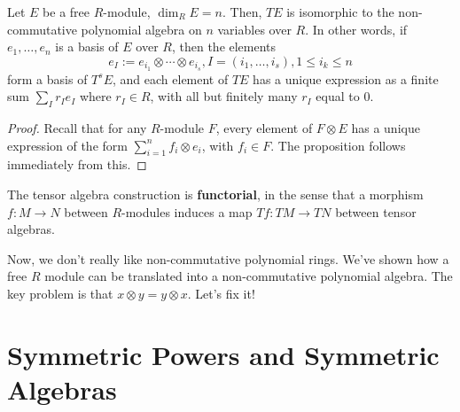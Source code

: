 \begin{prop}
    Let $E$ be a free $R$-module, $\dim _RE =n$. Then, $TE$ is isomorphic to the non-commutative polynomial algebra on $n$ variables over $R$. In other words, if $e_1,\dots,e_n$ is a basis of $E$ over $R$, then the elements
    $$e_I := e_{i_1}\otimes \cdots \otimes e_{i_s},I=(i_1,\dots,i_s),1\leq i_k \leq n$$
    form a basis of $T^sE$, and each element of $TE$ has a unique expression as a finite sum $\sum _I r_Ie_I$ where $r_I \in R$, with all but finitely many $r_I$ equal to $0$.
\end{prop}

\begin{proof}
    Recall that for any $R$-module $F$, every element of $F \otimes E$ has a unique expression of the form $\sum_{i=1}^n f_i \otimes e_i$, with $f_i \in F$. The proposition follows immediately from this.
\end{proof}

\begin{rmk}
    The tensor algebra construction is \textbf{functorial}, in the sense that a morphism $f:M \to N$ between $R$-modules induces a map $Tf :TM \to TN$ between tensor algebras.
\end{rmk}

Now, we don't really like non-commutative polynomial rings. We've shown how a free $R$ module can be translated into a non-commutative polynomial algebra. The key problem is that $x \otimes y = y \otimes x$. Let's fix it!

\section{Symmetric Powers and Symmetric Algebras}

